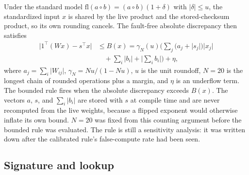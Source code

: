 \documentclass[preprint,12pt]{elsarticle}
\begin{document}
Under the standard model $\mathrm{fl}(a\circ b)=(a\circ b)(1+\delta)$ with $\lvert\delta\rvert\le u$, the standardized input $x$ is shared by the live product and the stored-checksum product, so its own rounding cancels. The fault-free absolute discrepancy then satisfies
\begin{equation}
\begin{split}
\lvert 1^\top(Wx)-s^\top x\rvert &\le B(x)=\gamma_N(u)\Big(\sum_j\big(a_j+\lvert s_j\rvert\big)\lvert x_j\rvert\\
&\quad+\sum_i\lvert b_i\rvert+\Big\lvert\sum_i b_i\Big\rvert\Big)+\eta,
\end{split}
\label{eq:bound}
\end{equation}
where $a_j=\sum_i\lvert W_{ij}\rvert$, $\gamma_N=Nu/(1-Nu)$, $u$ is the unit roundoff, $N=20$ is the longest chain of rounded operations plus a margin, and $\eta$ is an underflow term. The bounded rule fires when the absolute discrepancy exceeds $B(x)$. The vectors $a$, $s$, and $\sum_i\lvert b_i\rvert$ are stored with $s$ at compile time and are never recomputed from the live weights, because a flipped exponent would otherwise inflate its own bound. $N=20$ was fixed from this counting argument before the bounded rule was evaluated. The rule is still a sensitivity analysis: it was written down after the calibrated rule's false-compute rate had been seen.

\subsection{Signature and lookup}
\end{document}
